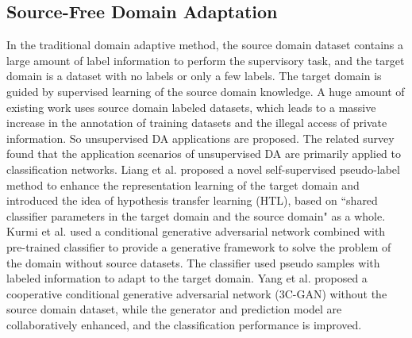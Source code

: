 \documentclass[sn-mathphys]{sn-jnl}%
\theoremstyle{thmstyleone}%
\theoremstyle{thmstyletwo}%
\theoremstyle{thmstylethree}%
\begin{document}
\subsection{Source-Free Domain Adaptation}
In the traditional domain adaptive method, the source domain dataset contains a large amount of label information to perform the supervisory task, and the target domain is a dataset with no labels or only a few labels. The target domain is guided by supervised learning of the source domain knowledge. A huge amount of existing work uses source domain labeled datasets, which leads to a massive increase in the annotation of training datasets and the illegal access of private information. So unsupervised DA applications are proposed. The related survey found that the application scenarios of unsupervised DA are primarily applied to classification networks. Liang et al.\cite{liang2020we} proposed a novel self-supervised pseudo-label method to enhance the representation learning of the target domain and introduced the idea of hypothesis transfer learning (HTL), based on ``shared classifier parameters in the target domain and the source domain" as a whole. Kurmi et al.\cite{kurmi2021domain} used a conditional generative adversarial network combined with pre-trained classifier to provide a generative framework to solve the problem of the domain without source datasets. The classifier used pseudo samples with labeled information to adapt to the target domain. Yang et al.\cite{yang2020unsupervised} proposed a cooperative conditional generative adversarial network (3C-GAN) without the source domain dataset, while the generator and prediction model are collaboratively enhanced, and the classification performance is improved.
\end{document}
